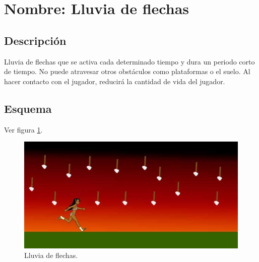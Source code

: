 		\section{Nombre: Lluvia de flechas}\label{obs.lluviaF}
	\subsection{Descripción}
	Lluvia de flechas que se activa cada determinado tiempo y dura un periodo corto de tiempo. No puede atravesar otros obstáculos como plataformas o el suelo. Al hacer contacto con el jugador, reducirá la cantidad de vida del jugador.
	\subsection{Esquema}
Ver figura \ref{fig:lluviaF}.
\begin{figure}
	\centering
	\includegraphics[height=0.3 \textheight]{Imagenes/flechas}
	\caption{Lluvia de flechas.}
	\label{fig:lluviaF}
\end{figure}